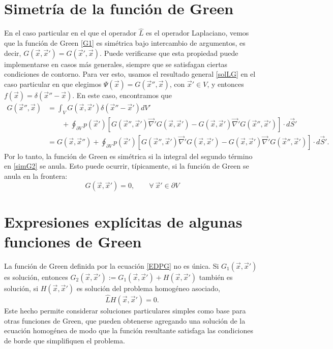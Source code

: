\section{Simetría de la función de Green}
En el caso particular en el que el operador $\hat{L}$ es el operador Laplaciano, vemos que la  función de Green \eqref{G1} es simétrica bajo intercambio de argumentos, es decir, $G(\vec{x},\vec{x}')=G(\vec{x}',\vec{x})$. Puede verificarse que esta propiedad puede implementarse en casos más generales, siempre que se satisfagan ciertas condiciones de contorno. Para ver esto, usamos el resultado general \eqref{solLG} en el caso particular en que elegimos $\Psi(\vec{x})=G(\vec{x}'',\vec{x})$, con $\vec{x}'\in V$, y entonces $f(\vec{x})=\delta(\vec{x}''-\vec{x})$. En este caso, encontramos que
\begin{align}\label{simG}
G(\vec{x}'',\vec{x}) &= \int_VG(\vec{x},\vec{x}')\delta(\vec{x}''-\vec{x}')dV' \nonumber\\
& \qquad +\oint_{\partial V}p(\vec{x}')\left[G(\vec{x}'',\vec{x}')\vec\nabla' G(\vec{x},\vec{x}') -G(\vec{x},\vec{x}')\vec\nabla'G(\vec{x}'',\vec{x}')\right]\cdot d\vec{S}' \\
&= G(\vec{x},\vec{x}'')+\oint_{\partial V}p(\vec{x}')\left[G(\vec{x}'',\vec{x}')\vec\nabla' G(\vec{x},\vec{x}')-G(\vec{x},\vec{x}')\vec\nabla'G(\vec{x}'',\vec{x}')\right]\cdot d\vec{S}'. \label{simG2}
\end{align}
Por lo tanto, la función de Green es simétrica si la integral del segundo término en \eqref{simG2} se anula. Esto puede ocurrir, típicamente, si la función de Green se anula en la frontera:
\begin{equation}
G(\vec{x},\vec{x}')=0, \qquad \forall\ \vec{x}'\in\partial V
\end{equation}

\section{Expresiones explícitas de algunas funciones de Green}
La función de Green definida por la ecuación \eqref{EDPG} no es única. Si $G_1(\vec{x},\vec{x}')$ es solución, entonces $G_2(\vec{x},\vec{x}'):=G_1(\vec{x},\vec{x}')+H(\vec{x},\vec{x}')$ también es solución, si $H(\vec{x},\vec{x}')$ es solución del problema homogéneo asociado, 
\begin{equation}
\hat{L}H(\vec{x},\vec{x}')=0.
\end{equation}
Este hecho permite considerar soluciones particulares simples como base para otras funciones de Green, que pueden obtenerse agregando una solución de la ecuación homogénea de modo que la función resultante satisfaga las condiciones de borde que simplifiquen el problema.

